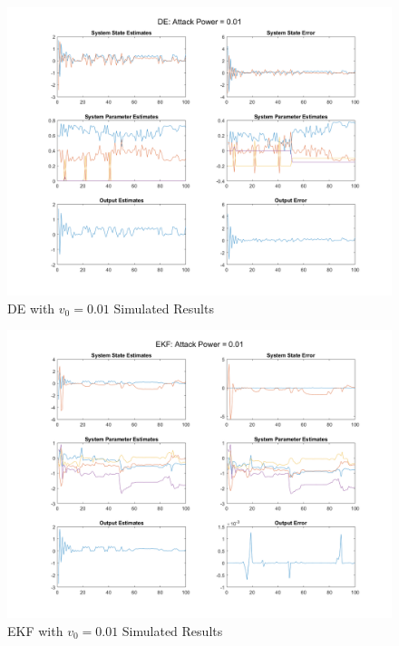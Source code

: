 \documentclass[]{article}
\begin{document}
\begin{figure}
	\centering
	\includegraphics[width=\linewidth]{../../fig/DE_attack_0_01}
	\caption{DE with $v_0 = 0.01$ Simulated Results}
	\label{fig:deattack001}
\end{figure}

\begin{figure}
	\centering
	\includegraphics[width=\linewidth]{../../fig/EKF_attack_0_01}
	\caption{EKF with $v_0 = 0.01$ Simulated Results}
	\label{fig:ekfattack001}
\end{figure}
\end{document}
